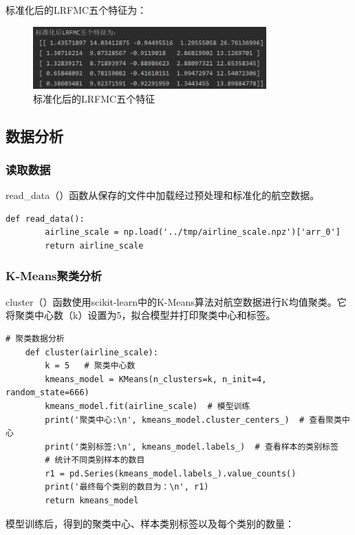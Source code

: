 \documentclass[UTF8,12pt]{article}
\begin{document}
标准化后的LRFMC五个特征为：

\begin{figure}[htbp]
    \centering
    \includegraphics[width=0.8\textwidth]{img/9.png}
    \caption{标准化后的LRFMC五个特征}
\end{figure}

\subsection{数据分析}
\subsubsection{读取数据}
read\_data（）函数从保存的文件中加载经过预处理和标准化的航空数据。

\begin{lstlisting}[title=读取数据,frame=shadowbox]
    def read_data():
        airline_scale = np.load('../tmp/airline_scale.npz')['arr_0']
        return airline_scale
\end{lstlisting}

\subsubsection{K-Means聚类分析}
cluster（）函数使用scikit-learn中的K-Means算法对航空数据进行K均值聚类。它将聚类中心数（k）设置为5，拟合模型并打印聚类中心和标签。

\begin{lstlisting}[title=K-Means聚类分析,frame=shadowbox]
    # 聚类数据分析
    def cluster(airline_scale):
        k = 5   # 聚类中心数
        kmeans_model = KMeans(n_clusters=k, n_init=4, random_state=666)
        kmeans_model.fit(airline_scale)  # 模型训练
        print('聚类中心:\n', kmeans_model.cluster_centers_)  # 查看聚类中心
        print('类别标签:\n', kmeans_model.labels_)  # 查看样本的类别标签
        # 统计不同类别样本的数目
        r1 = pd.Series(kmeans_model.labels_).value_counts()
        print('最终每个类别的数目为：\n', r1)
        return kmeans_model
\end{lstlisting}

模型训练后，得到的聚类中心、样本类别标签以及每个类别的数量：
\end{document}
